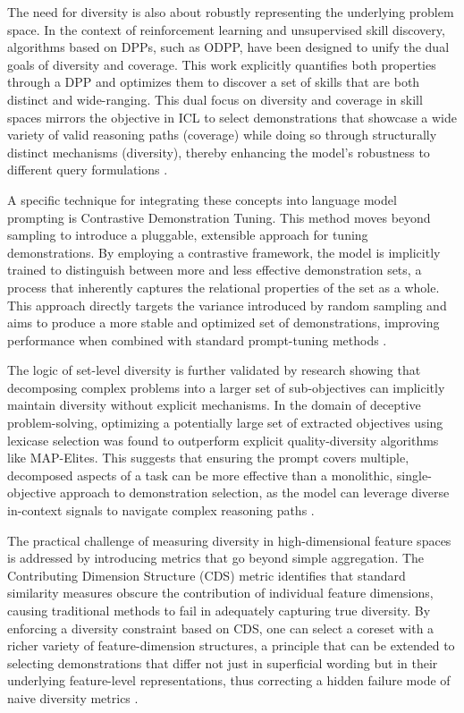 \documentclass[11pt]{article}
\begin{document}
The need for diversity is also about robustly representing the underlying problem space. In the context of reinforcement learning and unsupervised skill discovery, algorithms based on DPPs, such as ODPP, have been designed to unify the dual goals of diversity and coverage. This work explicitly quantifies both properties through a DPP and optimizes them to discover a set of skills that are both distinct and wide-ranging. This dual focus on diversity and coverage in skill spaces mirrors the objective in ICL to select demonstrations that showcase a wide variety of valid reasoning paths (coverage) while doing so through structurally distinct mechanisms (diversity), thereby enhancing the model's robustness to different query formulations \cite{ref140}.

A specific technique for integrating these concepts into language model prompting is Contrastive Demonstration Tuning. This method moves beyond sampling to introduce a pluggable, extensible approach for tuning demonstrations. By employing a contrastive framework, the model is implicitly trained to distinguish between more and less effective demonstration sets, a process that inherently captures the relational properties of the set as a whole. This approach directly targets the variance introduced by random sampling and aims to produce a more stable and optimized set of demonstrations, improving performance when combined with standard prompt-tuning methods \cite{ref141}.

The logic of set-level diversity is further validated by research showing that decomposing complex problems into a larger set of sub-objectives can implicitly maintain diversity without explicit mechanisms. In the domain of deceptive problem-solving, optimizing a potentially large set of extracted objectives using lexicase selection was found to outperform explicit quality-diversity algorithms like MAP-Elites. This suggests that ensuring the prompt covers multiple, decomposed aspects of a task can be more effective than a monolithic, single-objective approach to demonstration selection, as the model can leverage diverse in-context signals to navigate complex reasoning paths \cite{ref142}.

The practical challenge of measuring diversity in high-dimensional feature spaces is addressed by introducing metrics that go beyond simple aggregation. The Contributing Dimension Structure (CDS) metric identifies that standard similarity measures obscure the contribution of individual feature dimensions, causing traditional methods to fail in adequately capturing true diversity. By enforcing a diversity constraint based on CDS, one can select a coreset with a richer variety of feature-dimension structures, a principle that can be extended to selecting demonstrations that differ not just in superficial wording but in their underlying feature-level representations, thus correcting a hidden failure mode of naive diversity metrics \cite{ref143}.
\end{document}
